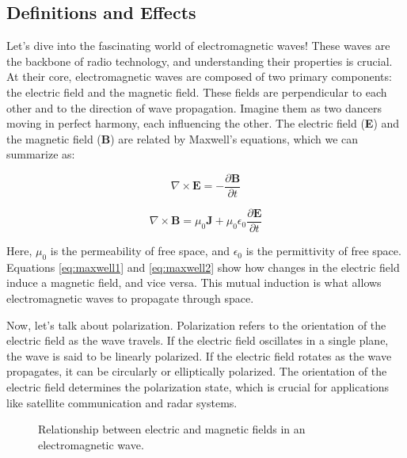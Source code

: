 \subsection{Definitions and Effects}
\label{subsec:ac-basics2}

Let's dive into the fascinating world of electromagnetic waves! These waves are the backbone of radio technology, and understanding their properties is crucial. At their core, electromagnetic waves are composed of two primary components: the electric field and the magnetic field. These fields are perpendicular to each other and to the direction of wave propagation. Imagine them as two dancers moving in perfect harmony, each influencing the other. The electric field (\textbf{E}) and the magnetic field (\textbf{B}) are related by Maxwell's equations, which we can summarize as:

\begin{equation}
\nabla \times \mathbf{E} = -\frac{\partial \mathbf{B}}{\partial t}
\label{eq:maxwell1}
\end{equation}

\begin{equation}
\nabla \times \mathbf{B} = \mu_0 \mathbf{J} + \mu_0 \epsilon_0 \frac{\partial \mathbf{E}}{\partial t}
\label{eq:maxwell2}
\end{equation}

Here, $\mu_0$ is the permeability of free space, and $\epsilon_0$ is the permittivity of free space. Equations \ref{eq:maxwell1} and \ref{eq:maxwell2} show how changes in the electric field induce a magnetic field, and vice versa. This mutual induction is what allows electromagnetic waves to propagate through space.

Now, let's talk about polarization. Polarization refers to the orientation of the electric field as the wave travels. If the electric field oscillates in a single plane, the wave is said to be linearly polarized. If the electric field rotates as the wave propagates, it can be circularly or elliptically polarized. The orientation of the electric field determines the polarization state, which is crucial for applications like satellite communication and radar systems.

\begin{figure}[h]
    \centering
    \caption{Relationship between electric and magnetic fields in an electromagnetic wave.}
    \label{fig:em-wave}
\end{figure}

